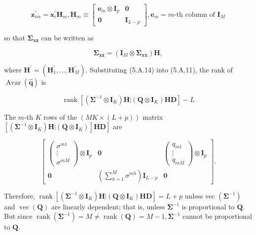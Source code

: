 \documentclass[10pt]{article}
\begin{document}
\[
\mathbf{z}_{i m}^{\prime}=\mathbf{x}_{i}^{\prime} \mathbf{H}_{m}, \mathbf{H}_{m} \equiv\left[\begin{array}{cc}
\mathbf{e}_{m} \otimes \mathbf{I}_{p} & \mathbf{0}  \tag{5.A.13}\\
\mathbf{0} & \mathbf{I}_{L-p}
\end{array}\right], \mathbf{e}_{m}=m \text {-th column of } \mathbf{I}_{M}
\]

so that $\mathbf{\Sigma}_{\mathbf{x z}}$ can be written as


\begin{equation*}
\boldsymbol{\Sigma}_{\mathbf{x z}}=\left(\mathbf{I}_{M} \otimes \boldsymbol{\Sigma}_{\mathbf{x x}}\right) \mathbf{H}, \tag{5.A.14}
\end{equation*}


where $\mathbf{H}^{\prime}=\left(\mathbf{H}_{1}^{\prime}, \ldots, \mathbf{H}_{M}^{\prime}\right)$. Substituting (5.A.14) into (5.A.11), the rank of $\operatorname{Avar}(\hat{\mathbf{q}})$ is

$$
\operatorname{rank}\left[\left(\boldsymbol{\Sigma}^{-1} \otimes \mathbf{I}_{K}\right) \mathbf{H} \vdots\left(\mathbf{Q} \otimes \mathbf{I}_{K}\right) \mathbf{H D}\right]-L
$$

The $m$-th $K$ rows of the $(M K \times(L+p))$ matrix $\left.\left[\left(\boldsymbol{\Sigma}^{-1} \otimes \mathbf{I}_{K}\right) \mathbf{H} \vdots\left(\mathbf{Q} \otimes \mathbf{I}_{K}\right)\right] \mathbf{H D}\right]$ are

\[
\left[\begin{array}{ccc}
\left(\begin{array}{c}
\sigma^{m 1} \\
\vdots \\
\sigma^{m M}
\end{array}\right) \otimes \mathbf{I}_{p} & \mathbf{0} & \left(\begin{array}{c}
q_{m 1} \\
\vdots \\
q_{m M}
\end{array}\right) \otimes \mathbf{I}_{p}  \tag{5.A.15}\\
\mathbf{0} & \left(\sum_{h=1}^{M} \sigma^{m h}\right) \mathbf{I}_{L-p} & \mathbf{0}
\end{array}\right] .
\]

Therefore, $\operatorname{rank}\left[\left(\boldsymbol{\Sigma}^{-1} \otimes \mathbf{I}_{K}\right) \mathbf{H} \vdots\left(\mathbf{Q} \otimes \mathbf{I}_{K}\right) \mathbf{H D}\right]=L+p$ unless vec $\left(\boldsymbol{\Sigma}^{-1}\right)$ and $\operatorname{vec}(\mathbf{Q})$ are linearly dependent; that is, unless $\boldsymbol{\Sigma}^{-1}$ is proportional to $\mathbf{Q}$. But since $\operatorname{rank}\left(\boldsymbol{\Sigma}^{-1}\right)=M \neq \operatorname{rank}(\mathbf{Q})=M-1, \boldsymbol{\Sigma}^{-1}$ cannot be proportional to $\mathbf{Q}$.
\end{document}
